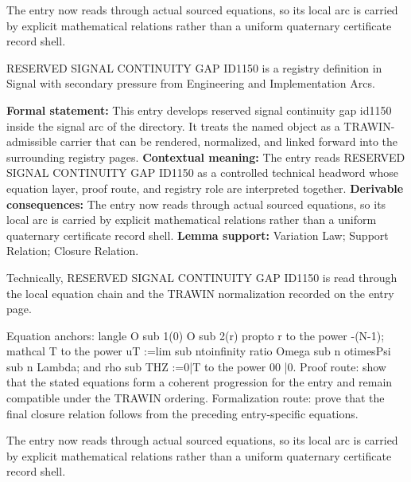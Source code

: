 The entry now reads through actual sourced equations, so its local arc is carried by explicit mathematical relations rather than a uniform quaternary certificate record shell.
\clearpage


\begingroup\small
{}
RESERVED SIGNAL CONTINUITY GAP ID1150 is a registry definition in Signal with secondary pressure from Engineering and Implementation Arcs.

\begingroup\footnotesize\setlength{\emergencystretch}{3em}\sloppy
\textbf{Formal statement:} This entry develops reserved signal continuity gap id1150 inside the signal arc of the directory. It treats the named object as a TRAWIN-admissible carrier that can be rendered, normalized, and linked forward into the surrounding registry pages. \textbf{Contextual meaning:} The entry reads RESERVED SIGNAL CONTINUITY GAP ID1150 as a controlled technical headword whose equation layer, proof route, and registry role are interpreted together. \textbf{Derivable consequences:} The entry now reads through actual sourced equations, so its local arc is carried by explicit mathematical relations rather than a uniform quaternary certificate record shell. \textbf{Lemma support:} Variation Law; Support Relation; Closure Relation.\par
\endgroup

Technically, RESERVED SIGNAL CONTINUITY GAP ID1150 is read through the local equation chain and the TRAWIN normalization recorded on the entry page.

Equation anchors: langle O sub 1(0) O sub 2(r) propto r to the power -(N-1); mathcal T to the power uT :=lim sub ntoinfinity ratio Omega sub n otimesPsi sub n Lambda; and rho sub THZ :=0|T to the power 00 |0. Proof route: show that the stated equations form a coherent progression for the entry and remain compatible under the TRAWIN ordering. Formalization route: prove that the final closure relation follows from the preceding entry-specific equations.

The entry now reads through actual sourced equations, so its local arc is carried by explicit mathematical relations rather than a uniform quaternary certificate record shell.
\endgroup

